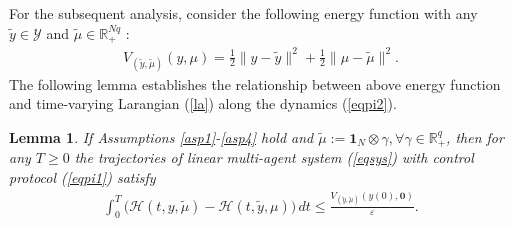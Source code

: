 \documentclass[letterpaper, 10 pt, conference]{ieeeconf}  %
\newtheorem{lemma}{ {Lemma}}
\begin{document}
For the subsequent analysis, consider the following energy function with any $\tilde{y}\in\mathcal{Y}$ and $\tilde{\mu}\in\mathbb{R}_+^{Nq}$ :
\begin{align}
	V_{(\tilde{y}, \tilde{\mu})}(y,\mu)= \frac{1}{2}\|y-\tilde{y}\|^2 + \frac{1}{2}\|\mu-\tilde{\mu}\|^2.\label{v1}
\end{align}
The following lemma establishes the relationship between above energy function and time-varying Larangian (\ref{la}) along the dynamics (\ref{eqpi2}).

\begin{lemma}\label{lemma4}
	If Assumptions \ref{asp1}-\ref{asp4} hold and $\tilde{\mu}:= \boldsymbol1_N \otimes \gamma, \forall \gamma\in \mathbb{R}_+^q$, then for any $T\ge0$ the trajectories of linear multi-agent system (\ref{eqsys}) with control protocol (\ref{eqpi1}) satisfy
	\begin{align}
		\int_{0}^{T} \Big( \mathcal{H}(t,y,\tilde{\mu})-\mathcal{H}(t,\tilde{y},\mu) \Big) \,dt\le\frac{V_{(\tilde{y}, \tilde{\mu})}(y(0), \boldsymbol{0})}{\varepsilon}.\label{l3}
	\end{align}
\end{lemma}
\end{document}
